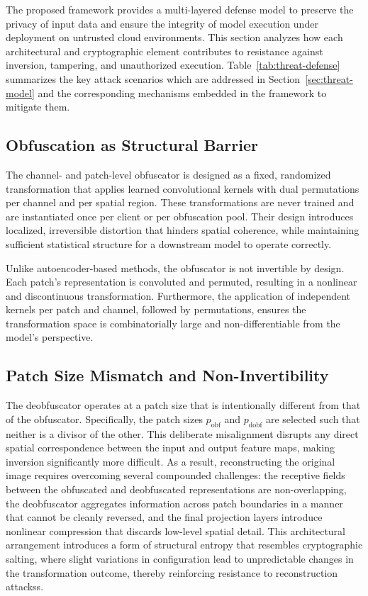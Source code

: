 \documentclass{ieeeaccess}
\begin{document}
The proposed framework provides a multi-layered defense model to preserve the privacy of input data and ensure the integrity of model execution under deployment on untrusted cloud environments. This section analyzes how each architectural and cryptographic element contributes to resistance against inversion, tampering, and unauthorized execution. Table~\ref{tab:threat-defense} summarizes the key attack scenarios which are addressed in Section~\ref{sec:threat-model} and the corresponding mechanisms embedded in the framework to mitigate them.

\subsection{Obfuscation as Structural Barrier}
The channel- and patch-level obfuscator is designed as a fixed, randomized transformation that applies learned convolutional kernels with dual permutations per channel and per spatial region. These transformations are never trained and are instantiated once per client or per obfuscation pool. Their design introduces localized, irreversible distortion that hinders spatial coherence, while maintaining sufficient statistical structure for a downstream model to operate correctly.

Unlike autoencoder-based methods, the obfuscator is not invertible by design. Each patch’s representation is convoluted and permuted, resulting in a nonlinear and discontinuous transformation. Furthermore, the application of independent kernels per patch and channel, followed by permutations, ensures the transformation space is combinatorially large and non-differentiable from the model’s perspective.

\subsection{Patch Size Mismatch and Non-Invertibility}
The deobfuscator operates at a patch size that is intentionally different from that of the obfuscator. Specifically, the patch sizes 
$p_{\text{obf}}$ and $p_{\text{dobf}}$ are selected such that neither is a divisor of the other. This deliberate misalignment disrupts any direct spatial correspondence between the input and output feature maps, making inversion significantly more difficult. As a result, reconstructing the original image requires overcoming several compounded challenges: the receptive fields between the obfuscated and deobfuscated representations are non-overlapping, the deobfuscator aggregates information across patch boundaries in a manner that cannot be cleanly reversed, and the final projection layers introduce nonlinear compression that discards low-level spatial detail. This architectural arrangement introduces a form of structural entropy that resembles cryptographic salting, where slight variations in configuration lead to unpredictable changes in the transformation outcome, thereby reinforcing resistance to reconstruction attackss.
\end{document}
